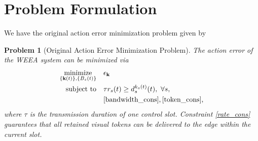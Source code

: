 \documentclass[lettersize,journal]{IEEEtran}
\theoremstyle{custom}
\newtheorem{Prob}{Problem}
\begin{document}


\section{Problem Formulation}
We have the original action error minimization problem given by
\begin{Prob}[Original Action Error Minimization Problem]\label{prob:p1}
    The action error of the WEEA system can be minimized via
    \begin{align}
        \underset{\{{\bf k}(t)\},\{B_s(t)\}}{\textrm{minimize}} \quad & \epsilon_{\bf k} \nonumber\\
        \textrm{subject to} \quad
        & \tau r_s(t) \geq d_s^{k_s(t)}(t), \ \forall s, \label{rate_cons}\\
        & \eqref{bandwidth_cons}, \eqref{token_cons}, \nonumber
    \end{align}
    where $\tau$ is the transmission duration of one control slot. Constraint \eqref{rate_cons} guarantees that all retained visual tokens can be delivered to the edge within the current slot.
\end{Prob}
\end{document}
